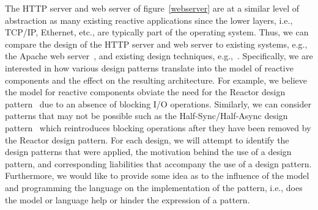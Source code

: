 The HTTP server and web server of figure~\ref{webserver} are at a similar level of abstraction as many existing reactive applications since the lower layers, i.e., TCP/IP, Ethernet, etc., are typically part of the operating system.
Thus, we can compare the design of the HTTP server and web server to existing systems, e.g., the Apache web server~\cite{apache}, and existing design techniques, e.g.,~\cite{schmidt2000pattern}.
Specifically, we are interested in how various design patterns translate into the model of reactive components and the effect on the resulting architecture.
For example, we believe the model for reactive components obviate the need for the Reactor design pattern~\cite{schmidt2000pattern} due to an absence of blocking I/O operations.
Similarly, we can consider patterns that may not be possible such as the Half-Sync/Half-Async design pattern~\cite{schmidt2000pattern} which reintroduces blocking operations after they have been removed by the Reactor design pattern.
For each design, we will attempt to identify the design patterns that were applied, the motivation behind the use of a design pattern, and corresponding liabilities that accompany the use of a design pattern.
Furthermore, we would like to provide some idea as to the influence of the model and programming the language on the implementation of the pattern, i.e., does the model or language help or hinder the expression of a pattern.




